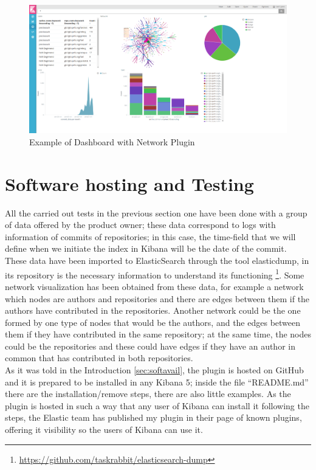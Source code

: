 \documentclass[a4paper, 12pt]{book}
\begin{document}
\begin{figure}[H]
  \centering
  \includegraphics[width=16cm, keepaspectratio]{img/results/dashboard}
  \caption{Example of Dashboard with Network Plugin}
  \label{fig:dashboard}
\end{figure}

\section{Software hosting and Testing}
\label{sec:softhostest}

All the carried out tests in the previous section one have been done with a group of data offered by the product owner; these data correspond to logs with information of commits of repositories; in this case, the time-field that we will define when we initiate the index in Kibana will be the date of the commit.
These data have been imported to ElasticSearch through the tool elasticdump, in its repository is the necessary information to understand its functioning \footnote{\url{https://github.com/taskrabbit/elasticsearch-dump}}.
Some network visualization has been obtained from these data, for example a network which nodes are authors and repositories and there are edges between them if the authors have contributed in the repositories. Another network could be the one formed by one type of nodes that would be the authors, and the edges between them if they have contributed in the same repository; at the same time, the nodes could be the repositories and these could have edges if they have an author in common that has contributed in both repositories.\\

As it was told in the Introduction \ref{sec:softavail}, the plugin is hosted on GitHub and it is prepared to be installed in any Kibana 5; inside the file “README.md” there are the installation/remove steps, there are also little examples. As the plugin is hosted in such a way that any user of Kibana can install it following the steps, the Elastic team has published my plugin in their page of known plugins, offering it visibility so the users of Kibana can use it.
\end{document}
